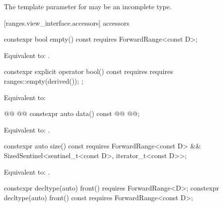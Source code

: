 \pnum
The template parameter for  may be an incomplete type.

[ranges.view_interface.accessors]{ accessors}

%
\begin{itemdecl}
constexpr bool empty() const requires ForwardRange<const D>;
\end{itemdecl}

\begin{itemdescr}
\pnum
\effects Equivalent to: .
\end{itemdescr}

%
\begin{itemdecl}
constexpr explicit operator bool() const
  requires requires { ranges::empty(derived()); };
\end{itemdecl}

\begin{itemdescr}
\pnum
\effects Equivalent to: 
\end{itemdescr}

%
\begin{itemdecl}
@@
    @@
constexpr auto data() const @@
  @@;
\end{itemdecl}

\begin{itemdescr}
\pnum
\effects Equivalent to: .
\end{itemdescr}

%
\begin{itemdecl}
constexpr auto size() const requires ForwardRange<const D> &&
SizedSentinel<sentinel_t<const D>, iterator_t<const D>>;
\end{itemdecl}

\begin{itemdescr}
\pnum
\effects Equivalent to: .
\end{itemdescr}

%
\begin{itemdecl}
constexpr decltype(auto) front() requires ForwardRange<D>;
constexpr decltype(auto) front() const requires ForwardRange<const D>;
\end{itemdecl}

